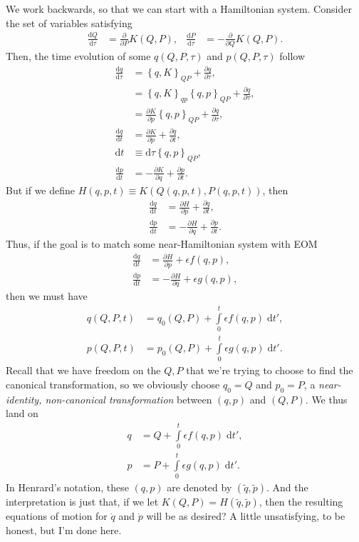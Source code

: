 \documentclass[12pt]{article}
\newcommand*{\rd}[2]{\frac{\mathrm{d}#1}{\mathrm{d}#2}}
\newcommand*{\pd}[2]{\frac{\partial#1}{\partial#2}}
\newcommand*{\p}[1]{\left(#1\right)}
\newcommand*{\z}[1]{\left\{#1\right\}}
\begin{document}
We work backwards, so that we can start with a Hamiltonian system. Consider the
set of variables satisfying
\begin{align}
    \rd{Q}{\tau} &= \pd{}{P}K\p{Q, P}, &
    \rd{P}{\tau} &= -\pd{}{Q}K\p{Q, P}.
\end{align}
Then, the time evolution of some $q\p{Q, P, \tau}$ and $p\p{Q, P, \tau}$ follow
\begin{align}
    \rd{q}{\tau} &= \z{q, K}_{QP} + \pd{q}{\tau},\\
        &= \z{q, K}_{qp}\z{q, p}_{QP} + \pd{q}{\tau},\\
        &= \pd{K}{p}\z{q, p}_{QP} + \pd{q}{\tau},\\
    \rd{q}{t} &= \pd{K}{p} + \pd{q}{t},\\
    \mathrm{d}t &\equiv \mathrm{d}\tau \z{q, p}_{QP},\\
    \rd{p}{t} &= -\pd{K}{q} + \pd{p}{t}.
\end{align}
But if we define $H\p{q, p, t} \equiv K\p{Q(q, p, t), P(q, p, t)}$, then
\begin{align}
    \rd{q}{t} &= \pd{H}{p} + \pd{q}{t},\\
    \rd{p}{t} &= -\pd{H}{q} + \pd{p}{t}.
\end{align}
Thus, if the goal is to match some near-Hamiltonian system with EOM
\begin{align}
    \rd{q}{t} &= \pd{H}{p} + \epsilon f(q, p),\\
    \rd{p}{t} &= -\pd{H}{q} + \epsilon g(q, p),
\end{align}
then we must have
\begin{align}
    q(Q, P, t) &= q_0(Q, P) + \int\limits_0^t
        \epsilon f(q, p)\;\mathrm{d}t',\\
    p(Q, P, t) &= p_0(Q, P) + \int\limits_0^t
        \epsilon g(q, p)\;\mathrm{d}t'.
\end{align}
Recall that we have freedom on the $Q, P$ that we're trying to choose to find
the canonical transformation, so we obviously choose $q_0 = Q$ and $p_0 = P$, a
\emph{near-identity, non-canonical transformation} between $(q, p)$ and $(Q,
P)$. We thus land on
\begin{align}
    q &= Q + \int\limits_0^t \epsilon f(q, p)\;\mathrm{d}t',\\
    p &= P + \int\limits_0^t \epsilon g(q, p)\;\mathrm{d}t'.
\end{align}
In Henrard's notation, these $(q, p)$ are denoted by $(\tilde{q}, \tilde{p})$.
And the interpretation is just that, if we let $K(Q, P) = H(\tilde{q},
\tilde{p})$, then the resulting equations of motion for $\dot{q}$ and $\dot{p}$
will be as desired? A little unsatisfying, to be honest, but I'm done here.
\end{document}
